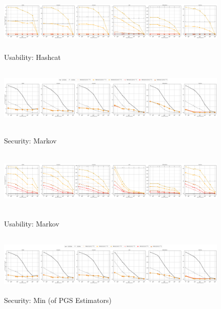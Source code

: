 \begin{figure}
		\includegraphics[width=\linewidth, height = 3cm]{Figures/Experiments/Utility/UsabilityHashcat}
		\vspace{-0.2in}
	\caption[Usability: Hashcat Estimator]{Usability: Hashcat}
		\label{fig:usabilityhashcat}


\end{figure}


\begin{figure}
	\includegraphics[width=\linewidth, height = 3cm]{Figures/Experiments/Attacker/SecurityMarkov}
\vspace{-0.2in}
\caption[Security: Markov Estimator]{Security: Markov}
\label{fig:securitymarkov}
\includegraphics[width=\linewidth, height = 3cm]{Figures/Experiments/Utility/UsabilityMarkov}
\vspace{-0.2in}
\caption[Usability: Neural Network Estimator]{Usability: Markov}
\label{fig:usabilitymarkov}	
		\includegraphics[width=\linewidth, height = 3cm]{Figures/Experiments/Attacker/SecurityMin}
	\vspace{-0.2in}
	\caption[Security: Min]{Security: Min (of PGS Estimators)}
	\label{fig:securitymin}
	

\end{figure}
